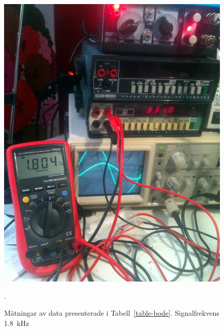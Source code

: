 \begin{figure}\label{fig:bode-foto-1800}
  \centering
  \includegraphics[width=\linewidth]{img/bode_1800Hz.jpg}
  \caption[] {Mätningar av data presenterade i Tabell~\ref{table-bode}.
              Signalfrekvens \SI{1.8}{\kHz}}.
\end{figure}

